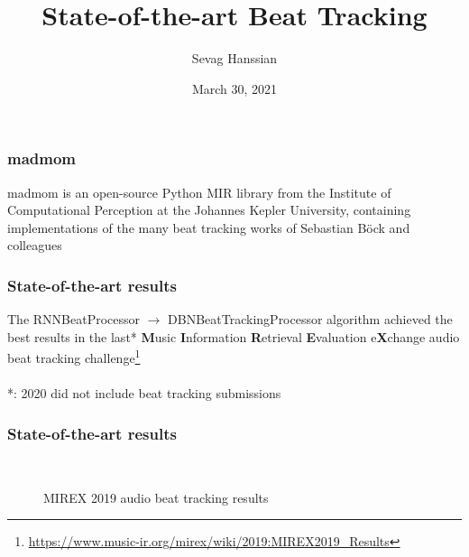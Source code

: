 \documentclass{beamer}
\title{State-of-the-art Beat Tracking}
\author{Sevag Hanssian}
\date{March 30, 2021}
\institute{MUMT 621, Winter 2021}
\begin{document}
\begin{frame}
\maketitle
\end{frame}

\begin{frame}
	\frametitle{madmom}
	madmom is an open-source Python MIR library from the Institute of Computational Perception at the Johannes Kepler University, containing implementations of the many beat tracking works of Sebastian B{\"o}ck and colleagues
\end{frame}

\begin{frame}
	\frametitle{State-of-the-art results}
	The RNNBeatProcessor $\rightarrow$ DBNBeatTrackingProcessor algorithm achieved the best results in the last* \textbf{M}usic \textbf{I}nformation \textbf{R}etrieval \textbf{E}valuation e\textbf{X}change audio beat tracking challenge\footnote{\url{https://www.music-ir.org/mirex/wiki/2019:MIREX2019_Results}}\\\ \\

	*: 2020 did not include beat tracking submissions
\end{frame}

\begin{frame}
	\frametitle{State-of-the-art results}
	\begin{figure}
		\\
		\vspace{0.1em}
		\caption{MIREX 2019 audio beat tracking results}
	\end{figure}
\end{frame}
\end{document}
